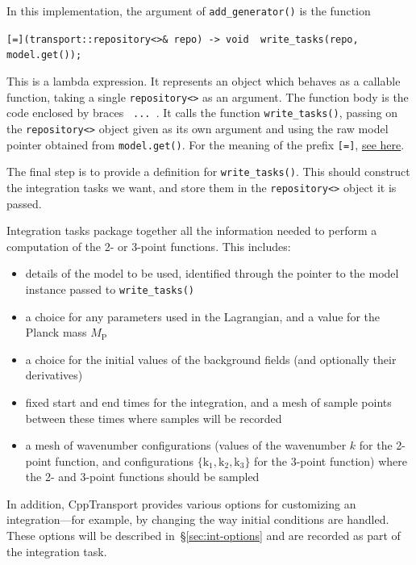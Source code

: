 \documentclass[11pt,a4paper]{article}
\newcommand{\Mp}{M_{\mathrm{P}}}
\newcommand{\vect}[1]{\bm{\mathrm{{#1}}}}
\newcommand{\packagefont}{\sffamily}
\newcommand{\CppTransport}{{\packagefont CppTransport}}
\newcommand{\semibold}[1]{{\fontseries{b}\selectfont{#1}}}
\newcommand{\para}[1]{\par\vspace{2mm}\noindent\semibold{{#1.}---}\ignorespaces}
\begin{document}
In this implementation, the argument of \texttt{add_generator()}
is the function
\begin{center}
    \texttt{[=](transport::repository<>& repo) -> void { write_tasks(repo, model.get()); }}
\end{center}
This is a lambda expression. It represents an object which behaves as a callable function,
taking a single \texttt{repository<>} as an argument.
The function body is the code enclosed by braces
\texttt{{ ... }}.
It calls the function \texttt{write_tasks()},
passing on the \texttt{repository<>} object
given as its own argument
and using the raw model pointer obtained from
\texttt{model.get()}.
For the meaning of the prefix
\texttt{[=]},
\href{http://en.cppreference.com/w/cpp/language/lambda}{see here}.

\para{Building a task}
The final step is to provide a definition
for \texttt{write_tasks()}.
This should construct the integration tasks we want, and store them
in the \texttt{repository<>} object it is passed.

Integration tasks package together all the information needed
to perform a computation of the 2- or 3-point functions.
This includes:
\begin{itemize}
	\item details of the model to be used, identified
	through the pointer to the model instance
	passed to \texttt{write_tasks()}
	
	\item a choice for any parameters
	used in the Lagrangian,
	and a value for the Planck mass $\Mp$
	
	\item a choice for the initial values of the background
	fields (and optionally their derivatives)
	
	\item fixed start and end times for the integration, and a mesh
	of sample points between these times where samples will be recorded
	
	\item a mesh of wavenumber configurations
	(values of the wavenumber $k$ for the 2-point function,
	and configurations $\{ \vect{k}_1, \vect{k}_2, \vect{k}_3 \}$ for the
	3-point function)
	where the 2- and 3-point functions should be sampled
\end{itemize}
In addition, {\CppTransport} provides various options for customizing an
integration---for example, by changing the way initial conditions are handled.
These options will be described in~\S\ref{sec:int-options}
and are recorded as part of the integration task.
\end{document}
